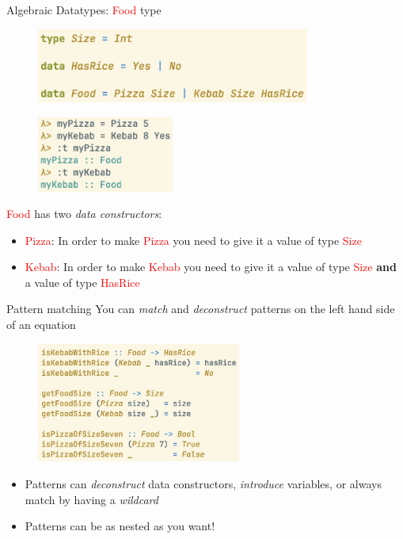 \documentclass[pdf]{beamer}
\newcommand{\code}[1]{\textcolor{Red}{\textsf{#1}}}
\begin{document}
\begin{frame}{Algebraic Datatypes: \code{Food} type}
  \begin{figure}[H]
    \centering
    \includegraphics[width=0.80\textwidth]{food-type}
  \end{figure}
  \begin{figure}[H]
    \centering
    \includegraphics[width=0.40\textwidth]{food-example}
  \end{figure}
  \code{Food} has two \emph{data constructors}:
  \begin{itemize}
  \item \code{Pizza}: In order to make \code{Pizza} you need to give it a value of type \code{Size}
  \item \code{Kebab}: In order to make \code{Kebab} you need to give it a value of type \code{Size} \textbf{and} a value of type \code{HasRice}
  \end{itemize}
\end{frame}

\begin{frame}{Pattern matching}
  You can \emph{match} and \emph{deconstruct} patterns on the left hand side of an equation

    \begin{figure}[H]
    \centering
    \includegraphics[width=0.60\textwidth]{food-pattern-match}
  \end{figure}

  \begin{itemize}
  \item Patterns can \emph{deconstruct} data constructors, \emph{introduce} variables, or always match by having a \emph{wildcard}
  \item Patterns can be as nested as you want!
  \end{itemize}
\end{frame}
\end{document}

